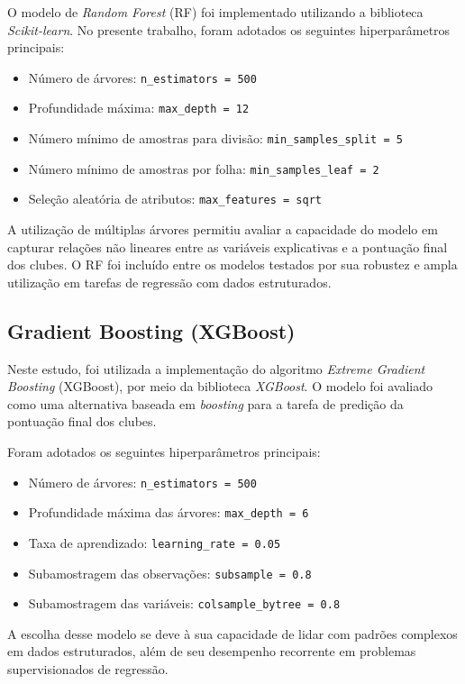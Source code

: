 O modelo de \textit{Random Forest} (RF) foi implementado utilizando a biblioteca \textit{Scikit-learn}. 
No presente trabalho, foram adotados os seguintes hiperparâmetros principais:

\begin{itemize}
    \item Número de árvores: \texttt{n\_estimators = 500}
    \item Profundidade máxima: \texttt{max\_depth = 12}
    \item Número mínimo de amostras para divisão: \texttt{min\_samples\_split = 5}
    \item Número mínimo de amostras por folha: \texttt{min\_samples\_leaf = 2}
    \item Seleção aleatória de atributos: \texttt{max\_features = sqrt}
\end{itemize}

A utilização de múltiplas árvores permitiu avaliar a capacidade do modelo em capturar relações não lineares entre as variáveis explicativas e a pontuação final dos clubes. 
O RF foi incluído entre os modelos testados por sua robustez e ampla utilização em tarefas de regressão com dados estruturados.

\subsection{Gradient Boosting (XGBoost)}

Neste estudo, foi utilizada a implementação do algoritmo \textit{Extreme Gradient Boosting} (XGBoost), por meio da biblioteca \textit{XGBoost}. 
O modelo foi avaliado como uma alternativa baseada em \textit{boosting} para a tarefa de predição da pontuação final dos clubes.

Foram adotados os seguintes hiperparâmetros principais:

\begin{itemize}
    \item Número de árvores: \texttt{n\_estimators = 500}
    \item Profundidade máxima das árvores: \texttt{max\_depth = 6}
    \item Taxa de aprendizado: \texttt{learning\_rate = 0.05}
    \item Subamostragem das observações: \texttt{subsample = 0.8}
    \item Subamostragem das variáveis: \texttt{colsample\_bytree = 0.8}
\end{itemize}

A escolha desse modelo se deve à sua capacidade de lidar com padrões complexos em dados estruturados, além de seu desempenho recorrente em problemas 
supervisionados de regressão.

